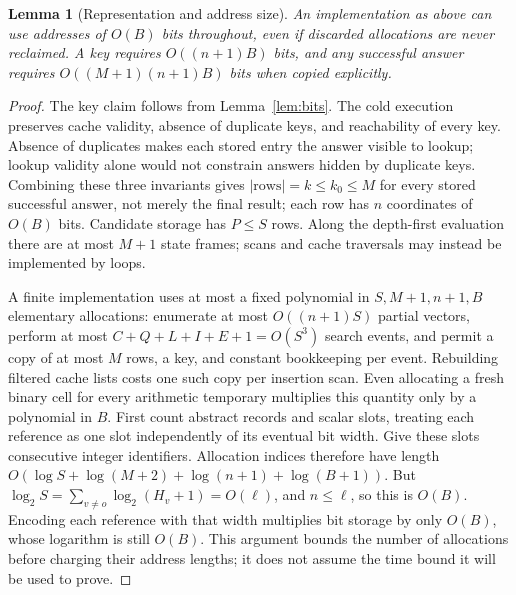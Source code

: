 \documentclass[11pt,a4paper]{article}
\newtheorem{lemma}[theorem]{Lemma}
\theoremstyle{definition}
\theoremstyle{remark}
\begin{document}
\begin{lemma}[Representation and address size]\label{lem:space}
An implementation as above can use addresses of \(O(B)\) bits throughout,
even if discarded allocations are never reclaimed. A key requires
\(O((n+1)B)\) bits, and any successful answer requires
\(O((M+1)(n+1)B)\) bits when copied explicitly.
\end{lemma}
\begin{proof}
The key claim follows from Lemma~\ref{lem:bits}. The cold execution preserves
cache validity, absence of duplicate keys, and reachability of every key.
Absence of duplicates makes each stored entry the answer visible to lookup;
lookup validity alone would not constrain answers hidden by duplicate keys.
Combining these three invariants gives \(|\mathrm{rows}|=k\le k_0\le M\)
for every stored successful answer, not merely the final result; each row
has \(n\) coordinates of \(O(B)\) bits. Candidate storage has \(P\le S\)
rows. Along the depth-first evaluation there are at most \(M+1\) state
frames; scans and cache traversals may instead be implemented by loops.

A finite implementation uses at most a fixed polynomial in
\(S,M+1,n+1,B\) elementary allocations: enumerate at most \(O((n+1)S)\)
partial vectors, perform at most \(C+Q+L+I+E+1=O(S^3)\) search events,
and permit a copy of at most \(M\) rows, a key, and constant bookkeeping
per event. Rebuilding filtered cache lists costs one such copy per
insertion scan. Even allocating a fresh binary cell for every arithmetic
temporary multiplies this quantity only by a polynomial in \(B\).
First count abstract records and scalar slots, treating each reference as one
slot independently of its eventual bit width. Give these slots consecutive
integer identifiers. Allocation indices therefore have length
\(O(\log S+\log(M+2)+\log(n+1)+\log(B+1))\).
But \(\log_2 S=\sum_{v\ne o}\log_2(H_v+1)=O(\ell)\),
and \(n\le\ell\), so this is \(O(B)\). Encoding each reference with that
width multiplies bit storage by only \(O(B)\), whose logarithm is still
\(O(B)\). This argument bounds the number
of allocations before charging their address lengths; it does not assume
the time bound it will be used to prove.
\end{proof}
\end{document}
